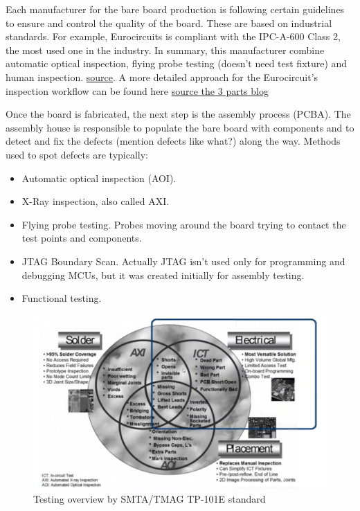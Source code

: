 \documentclass[final]{cubedoc}
\begin{document}
	Each manufacturer for the bare board production is following certain guidelines to ensure and control the quality of the board. These are based on industrial standards. For example, Eurocircuits is compliant with the IPC-A-600 Class 2, the most used one in the industry. In summary, this manufacturer combine  automatic optical inspection, flying probe testing (doesn't need test fixture) and human inspection. \href{https://www.eurocircuits.com/making-a-pcb-pcb-manufacture-step-by-step/}{source}. A more detailed approach for the Eurocircuit's inspection workflow can be found here  \href{https://www.eurocircuits.com/blog/how-do-we-assure-the-quality-of-your-pcb-part-1/}{source the 3 parts blog}
	
	Once the board is fabricated, the next step is the assembly process (PCBA). The assembly house is responsible to populate the bare board with components and to detect and fix the defects (mention defects like what?) along the way. Methods used to spot defects are typically:
	\begin{itemize}
		\item Automatic optical inspection (AOI).
		\item X-Ray inspection, also called AXI.
		\item Flying probe testing. Probes moving around the board trying to contact the test points and components.
		\item JTAG Boundary Scan. Actually JTAG isn't used only for programming and debugging MCUs, but it was created initially for assembly testing.
		\item Functional testing. 
	\end{itemize} 
	
	\begin{figure}[h!]
		\centering
		\includegraphics[keepaspectratio, width = \textwidth, height=.4\textheight]{assets/testing_overview.png}
		\caption{Testing overview by SMTA/TMAG TP-101E standard}
	\end{figure}
	
\end{document}
